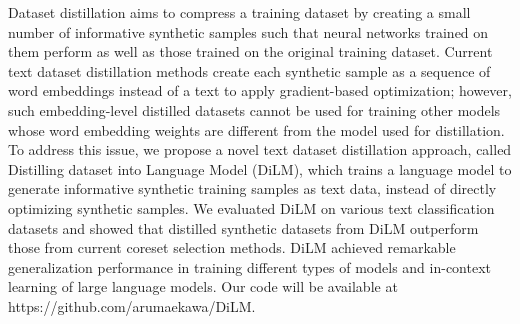 Dataset distillation aims to compress a training dataset by creating a small number of informative synthetic samples such that neural networks trained on them perform as well as those trained on the original training dataset. Current text dataset distillation methods create each synthetic sample as a sequence of word embeddings instead of a text to apply gradient-based optimization; however, such embedding-level distilled datasets cannot be used for training other models whose word embedding weights are different from the model used for distillation. To address this issue, we propose a novel text dataset distillation approach, called Distilling dataset into Language Model (DiLM), which trains a language model to generate informative synthetic training samples as text data, instead of directly optimizing synthetic samples. We evaluated DiLM on various text classification datasets and showed that distilled synthetic datasets from DiLM outperform those from current coreset selection methods. DiLM achieved remarkable generalization performance in training different types of models and in-context learning of large language models. Our code will be available at https://github.com/arumaekawa/DiLM.